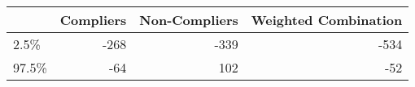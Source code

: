 
\begin{tabular}{l|r|r|r}
\hline
  & Compliers & Non-Compliers & Weighted Combination\\
\hline
2.5\% & -268 & -339 & -534\\
\hline
97.5\% & -64 & 102 & -52\\
\hline
\end{tabular}
